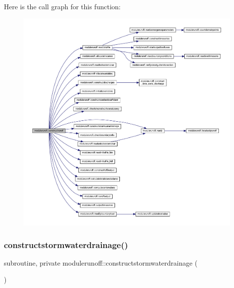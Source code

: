 Here is the call graph for this function\+:\nopagebreak
\begin{figure}[H]
\begin{center}
\leavevmode
\includegraphics[width=350pt]{namespacemodulerunoff_afd5b620864c9f62a5b0258956c609766_cgraph}
\end{center}
\end{figure}
\mbox{\label{namespacemodulerunoff_a03335615cccffdf4fcbc7979c2e2b299}} 
\subsubsection{\texorpdfstring{constructstormwaterdrainage()}{constructstormwaterdrainage()}}
{\footnotesize\ttfamily subroutine, private modulerunoff\+::constructstormwaterdrainage (\begin{DoxyParamCaption}{ }\end{DoxyParamCaption})\hspace{0.3cm}{\ttfamily [private]}}

